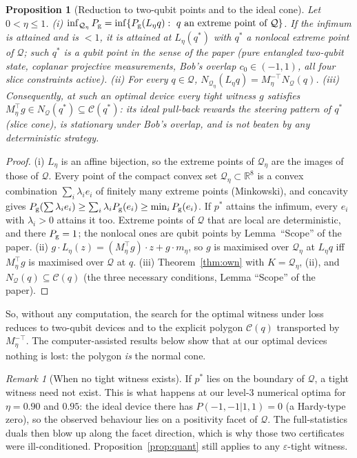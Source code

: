 \documentclass[11pt]{article}
\newtheorem{proposition}{Proposition}
\theoremstyle{definition}\newtheorem{definition}{Definition}
\theoremstyle{remark}\newtheorem{remark}{Remark}
\newcommand{\Q}{\mathcal Q}
\newcommand{\R}{\mathbb R}
\newcommand{\Pg}{P_{\rm g}}
\begin{document}
\begin{proposition}[Reduction to two-qubit points and to the ideal cone]\label{prop:reduce}
Let $0<\eta\le1$.
(i) $\inf_{\Q_\eta}\Pg=\inf\{\Pg(L_\eta q):\ q \text{ an extreme point of }\Q\}$. If the infimum is attained and is $<1$, it is attained at $L_\eta(q^*)$ with $q^*$ a nonlocal extreme point of $\Q$; such $q^*$ is a qubit point in the sense of the paper (pure entangled two-qubit state, coplanar projective measurements, Bob's overlap $c_0\in(-1,1)$, all four slice constraints active).
(ii) For every $q\in\Q$, $N_{\Q_\eta}(L_\eta q)=M_\eta^{-\top}N_\Q(q)$.
(iii) Consequently, at such an optimal device every tight witness $g$ satisfies $M_\eta^\top g\in N_\Q(q^*)\subseteq\mathcal C(q^*)$: its ideal pull-back rewards the steering pattern of $q^*$ (slice cone), is stationary under Bob's overlap, and is not beaten by any deterministic strategy.
\end{proposition}
\begin{proof}
(i) $L_\eta$ is an affine bijection, so the extreme points of $\Q_\eta$ are the images of those of $\Q$. Every point of the compact convex set $\Q_\eta\subset\R^8$ is a convex combination $\sum_i\lambda_ie_i$ of finitely many extreme points (Minkowski), and concavity gives $\Pg(\sum\lambda_ie_i)\ge\sum_i\lambda_i\Pg(e_i)\ge\min_i\Pg(e_i)$. If $p^*$ attains the infimum, every $e_i$ with $\lambda_i>0$ attains it too. Extreme points of $\Q$ that are local are deterministic, and there $\Pg=1$; the nonlocal ones are qubit points by Lemma~``Scope'' of the paper.
(ii) $g\cdot L_\eta(z)=(M_\eta^\top g)\cdot z+g\cdot m_\eta$, so $g$ is maximised over $\Q_\eta$ at $L_\eta q$ iff $M_\eta^\top g$ is maximised over $\Q$ at $q$.
(iii) Theorem~\ref{thm:own} with $K=\Q_\eta$, (ii), and $N_\Q(q)\subseteq\mathcal C(q)$ (the three necessary conditions, Lemma ``Scope'' of the paper).
\end{proof}
\noindent So, without any computation, the search for the optimal witness under loss reduces to two-qubit devices and to the explicit polygon $\mathcal C(q)$ transported by $M_\eta^{-\top}$. The computer-assisted results below show that at our optimal devices nothing is lost: the polygon \emph{is} the normal cone.

\begin{remark}[When no tight witness exists]
If $p^*$ lies on the boundary of $\Q$, a tight witness need not exist. This is what happens at our level-3 numerical optima for $\eta=0.90$ and $0.95$: the ideal device there has $P(-1,-1|1,1)=0$ (a Hardy-type zero), so the observed behaviour lies on a positivity facet of $\Q$. The full-statistics duals then blow up along the facet direction, which is why those two certificates were ill-conditioned. Proposition~\ref{prop:quant} still applies to any $\varepsilon$-tight witness.
\end{remark}
\end{document}

